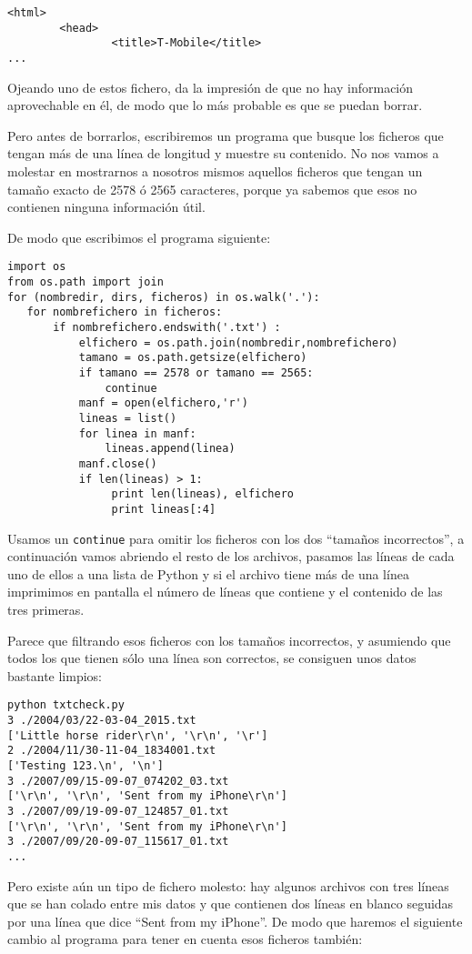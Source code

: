 \beforeverb
\begin{verbatim}
<html>
        <head>
                <title>T-Mobile</title>
...
\end{verbatim}
\afterverb
%
Ojeando uno de estos fichero, da la impresión de que no hay información aprovechable
en él, de modo que lo más probable es que se puedan borrar.

Pero antes de borrarlos, escribiremos un programa que busque los ficheros
que tengan más de una línea de longitud y muestre su contenido.
No nos vamos a molestar en mostrarnos a nosotros mismos aquellos ficheros que tengan
un tamaño exacto de 2578 ó 2565 caracteres, porque ya sabemos que esos no contienen
ninguna información útil.

De modo que escribimos el programa siguiente:

\beforeverb
\begin{verbatim}
import os
from os.path import join
for (nombredir, dirs, ficheros) in os.walk('.'):
   for nombrefichero in ficheros:
       if nombrefichero.endswith('.txt') :
           elfichero = os.path.join(nombredir,nombrefichero)
           tamano = os.path.getsize(elfichero)
           if tamano == 2578 or tamano == 2565:
               continue
           manf = open(elfichero,'r')
           lineas = list()
           for linea in manf:
               lineas.append(linea)
           manf.close()
           if len(lineas) > 1:
                print len(lineas), elfichero
                print lineas[:4]
\end{verbatim}
\afterverb
%
Usamos un {\tt continue} para omitir los ficheros con los dos
``tamaños incorrectos'', a continuación vamos abriendo el resto de los archivos,
pasamos las líneas de cada uno de ellos a una lista de Python
y si el archivo tiene más de una línea imprimimos
en pantalla el número de líneas que contiene y el contenido
de las tres primeras.

Parece que filtrando esos ficheros con los tamaños incorrectos, y asumiendo
que todos los que tienen sólo una línea son correctos, se
consiguen unos datos bastante limpios:

\beforeverb
\begin{verbatim}
python txtcheck.py 
3 ./2004/03/22-03-04_2015.txt
['Little horse rider\r\n', '\r\n', '\r']
2 ./2004/11/30-11-04_1834001.txt
['Testing 123.\n', '\n']
3 ./2007/09/15-09-07_074202_03.txt
['\r\n', '\r\n', 'Sent from my iPhone\r\n']
3 ./2007/09/19-09-07_124857_01.txt
['\r\n', '\r\n', 'Sent from my iPhone\r\n']
3 ./2007/09/20-09-07_115617_01.txt
...
\end{verbatim}
\afterverb
%
Pero existe aún un tipo de fichero molesto:
hay algunos archivos con tres líneas que se han
colado entre mis datos y que contienen
dos líneas en blanco seguidas por una línea que dice
``Sent from my iPhone''. De modo que haremos el siguiente cambio
al programa para tener en cuenta esos ficheros también:

